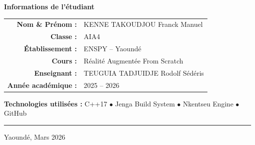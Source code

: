 \documentclass[12pt,a4paper]{report}
\begin{document}
\begin{titlepage}
\begin{center}
        \begin{tcolorbox}[
            colback=blue!5!white,
            colframe=titlecolor,
            width=0.8\linewidth
        ]
        \centering
        {\large\textbf{Informations de l'étudiant}}\\[0.5em]
        \begin{tabular}{rl}
            \textbf{Nom \& Prénom :} & KENNE TAKOUDJOU Franck Manuel \\[0.3em]
            \textbf{Classe :} & AIA4 \\[0.3em]
            \textbf{Établissement :} & ENSPY -- Yaoundé \\[0.3em]
            \textbf{Cours :} & Réalité Augmentée From Scratch \\[0.3em]
            \textbf{Enseignant :} & TEUGUIA TADJUIDJE Rodolf Sédéris \\[0.3em]
            \textbf{Année académique :} & 2025 -- 2026 \\
        \end{tabular}
        \end{tcolorbox}

        \vspace{1cm}

        \begin{tcolorbox}[
            colback=gray!5!white,
            colframe=codegray,
            width=0.8\linewidth
        ]
        \centering
        {\normalsize
        \textbf{Technologies utilisées :}
        C++17 \quad $\bullet$ \quad
        Jenga Build System \quad $\bullet$ \quad
        Nkentseu Engine \quad $\bullet$ \quad
        GitHub
        }
        \end{tcolorbox}

        \vfill

        \textcolor{titlecolor}{\rule{\linewidth}{2pt}}
        \vspace{0.3cm}
        {\large Yaoundé, Mars 2026}

    \end{center}
\end{titlepage}

\tableofcontents
\newpage

\end{document}
